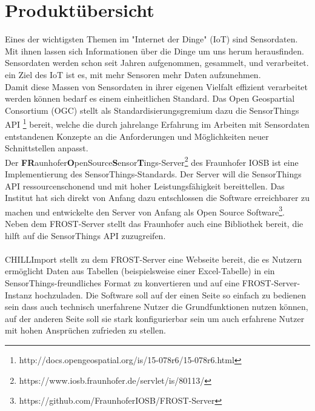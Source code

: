 \documentclass[12 pt]{article}
\begin{document}
	
	\section{Produktübersicht}

	Eines der wichtigsten Themen im "{Internet der Dinge}" (IoT) sind Sensordaten. Mit ihnen lassen sich Informationen über die Dinge um uns herum herausfinden. Sensordaten werden schon seit Jahren aufgenommen, gesammelt, und verarbeitet. ein Ziel des IoT ist es, mit mehr Sensoren mehr Daten aufzunehmen. \\

	Damit diese Massen von Sensordaten in ihrer eigenen Vielfalt effizient verarbeitet werden können bedarf es einem einheitlichen Standard. Das Open Geospartial Consortium (OGC) stellt als Standardisierungsgremium dazu die SensorThings API \footnote{http://docs.opengeospatial.org/is/15-078r6/15-078r6.html} bereit, welche die durch jahrelange Erfahrung im Arbeiten mit Sensordaten entstandenen Konzepte an die Anforderungen und Möglichkeiten neuer Schnittstellen anpasst. \\

	Der \textbf{FR}aunhofer\textbf{O}penSource\textbf{S}ensor\textbf{T}ings-Server\footnote{https://www.iosb.fraunhofer.de/servlet/is/80113/} des Fraunhofer IOSB ist eine Implementierung des SensorThings-Standards. Der Server will die SensorThings API ressourcenschonend und mit hoher Leistungsfähigkeit bereittellen. Das Institut hat sich direkt von Anfang dazu entschlossen die Software erreichbarer zu machen und entwickelte den Server von Anfang als Open Source Software\footnote{https://github.com/FraunhoferIOSB/FROST-Server}. \\

	Neben dem FROST-Server stellt das Fraunhofer auch eine Bibliothek bereit, die hilft auf die SensorThings API zuzugreifen. \\
	\ \\
	CHILLImport stellt zu dem FROST-Server eine Webseite bereit, die es Nutzern ermöglicht Daten aus Tabellen (beispielsweise einer Excel-Tabelle) in ein SensorThings-freundliches Format zu konvertieren und auf eine FROST-Server-Instanz hochzuladen. Die Software soll auf der einen Seite so einfach zu bedienen sein dass auch technisch unerfahrene Nutzer die Grundfunktionen nutzen können, auf der anderen Seite soll sie stark konfigurierbar sein um auch erfahrene Nutzer mit hohen Ansprüchen zufrieden zu stellen.\\
\end{document}
